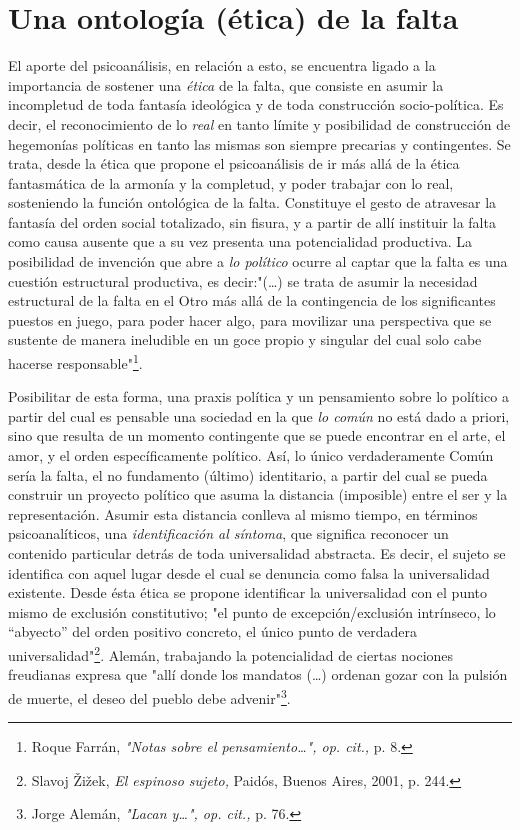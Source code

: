 \documentclass{book}
\begin{document}
\section{Una ontología (ética) de la falta}

El aporte del psicoanálisis, en relación a esto, se encuentra ligado a
la importancia de sostener una \emph{ética} de la falta, que consiste en
asumir la incompletud de toda fantasía ideológica y de toda construcción
socio-política. Es decir, el reconocimiento de lo \emph{real} en tanto
límite y posibilidad de construcción de hegemonías políticas en tanto
las mismas son siempre precarias y contingentes. Se trata, desde la
ética que propone el psicoanálisis de ir más allá de la ética
fantasmática de la armonía y la completud, y poder trabajar con lo real,
sosteniendo la función ontológica de la falta. Constituye el gesto de
atravesar la fantasía del orden social totalizado, sin fisura, y a
partir de allí instituir la falta como causa ausente que a su vez
presenta una potencialidad productiva. La posibilidad de invención que
abre a \emph{lo político} ocurre al captar que la falta es una cuestión
estructural productiva, es decir:"(\dots) se trata de asumir la
necesidad estructural de la falta en el Otro más allá de la contingencia
de los significantes puestos en juego, para poder hacer algo, para
movilizar una perspectiva que se sustente de manera ineludible en un
goce propio y singular del cual solo cabe hacerse
responsable"\footnote{Roque Farrán, \emph{"Notas sobre el
  pensamiento\ldots", op. cit.,} p. 8.}.

Posibilitar de esta forma, una praxis política y un pensamiento sobre lo
político a partir del cual es pensable una sociedad en la que \emph{lo
común} no está dado a priori, sino que resulta de un momento contingente
que se puede encontrar en el arte, el amor, y el orden específicamente
político. Así, lo único verdaderamente Común sería la falta, el no
fundamento (último) identitario, a partir del cual se pueda construir un
proyecto político que asuma la distancia (imposible) entre el ser y la
representación. Asumir esta distancia conlleva al mismo tiempo, en
términos psicoanalíticos, una \emph{identificación al síntoma}, que
significa reconocer un contenido particular detrás de toda universalidad
abstracta. Es decir, el sujeto se identifica con aquel lugar desde el
cual se denuncia como falsa la universalidad existente. Desde ésta ética
se propone identificar la universalidad con el punto mismo de exclusión
constitutivo; "el punto de excepción/exclusión intrínseco, lo
``abyecto'' del orden positivo concreto, el único punto de verdadera
universalidad"\footnote{Slavoj Žižek, \emph{El espinoso sujeto,} Paidós,
  Buenos Aires, 2001, p. 244.}. Alemán, trabajando la potencialidad de
ciertas nociones freudianas expresa que "allí donde los mandatos
(\dots) ordenan gozar con la pulsión de muerte, el deseo del pueblo
debe advenir"\footnote{Jorge Alemán, \emph{"Lacan y\ldots", op. cit.,}
  p. 76.}.
\end{document}
